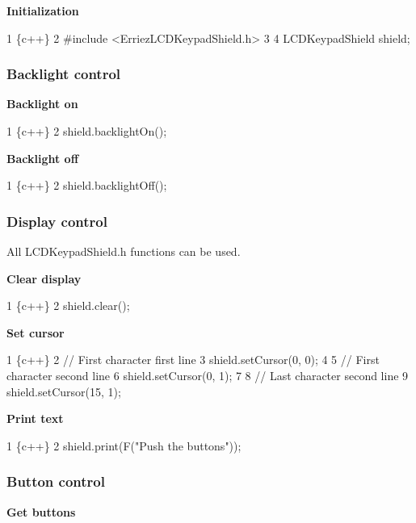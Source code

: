 {\bfseries Initialization}


\begin{DoxyCode}
1 \{c++\}
2 #include <ErriezLCDKeypadShield.h>
3 
4 LCDKeypadShield shield;
\end{DoxyCode}


\subsubsection*{Backlight control}

{\bfseries Backlight on}


\begin{DoxyCode}
1 \{c++\}
2 shield.backlightOn();
\end{DoxyCode}


{\bfseries Backlight off}


\begin{DoxyCode}
1 \{c++\}
2 shield.backlightOff();
\end{DoxyCode}


\subsubsection*{Display control}

All {\ttfamily L\+C\+D\+Keypad\+Shield.\+h} functions can be used.

{\bfseries Clear display}


\begin{DoxyCode}
1 \{c++\}
2 shield.clear();
\end{DoxyCode}


{\bfseries Set cursor}


\begin{DoxyCode}
1 \{c++\}
2 // First character first line
3 shield.setCursor(0, 0);
4 
5 // First character second line
6 shield.setCursor(0, 1);
7 
8 // Last character second line
9 shield.setCursor(15, 1);
\end{DoxyCode}


{\bfseries Print text}


\begin{DoxyCode}
1 \{c++\}
2 shield.print(F("Push the buttons"));
\end{DoxyCode}


\subsubsection*{Button control}

{\bfseries Get buttons}


